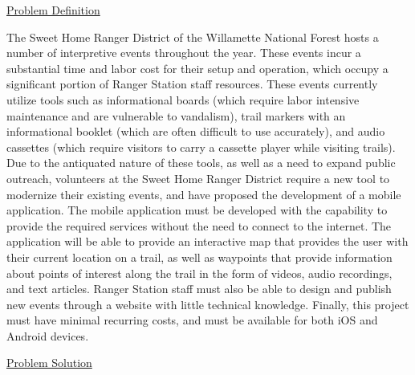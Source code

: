 \documentclass[letterpaper,10pt,titlepage]{article}
\begin{document}
\begin{center}
\underline{Problem Definition}\\
\vspace{0.3cm}
\end{center}

The Sweet Home Ranger District of the Willamette National Forest hosts a number of interpretive events throughout the year. These events incur a substantial time and labor cost for their setup and operation, which occupy a significant portion of Ranger Station staff resources. These events currently utilize tools such as informational boards (which require labor intensive maintenance and are vulnerable to vandalism), trail markers with an informational booklet (which are often difficult to use accurately), and audio cassettes (which require visitors to carry a cassette player while visiting trails). Due to the antiquated nature of these tools, as well as a need to expand public outreach, volunteers at the Sweet Home Ranger District require a new tool to modernize their existing events, and have proposed the development of a mobile application. The mobile application must be developed with the capability to provide the required services without the need to connect to the internet. The application will be able to provide an interactive map that provides the user with their current location on a trail, as well as waypoints that provide information about points of interest along the trail in the form of videos, audio recordings, and text articles. Ranger Station staff must also be able to design and publish new events through a website with little technical knowledge. Finally, this project must have minimal recurring costs, and must be available for both iOS and Android devices.\\
\vspace{0.8cm}


\begin{center}
\underline{Problem Solution}\\
\vspace{0.3cm}
\end{center}
\end{document}
